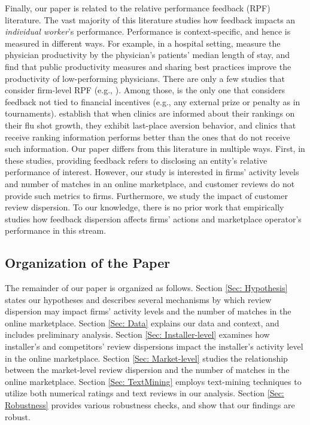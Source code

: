 \documentclass[msom,blindrev]{informs3}
\begin{document}
	
	
	
	Finally, our paper is related to the relative performance feedback (RPF) literature. The vast majority of this literature studies how feedback impacts an \emph{individual worker}'s performance. Performance is context-specific, and hence is measured in different ways. For example, in a hospital setting, \cite{song2017closing} measure the physician productivity by the physician's patients' median length of stay, and find that public productivity measures and sharing best practices improve the productivity of low-performing physicians. There are only a few studies that consider firm-level RPF (e.g., \cite{josse2013}). Among those, \cite{staats} is the only one that considers feedback not tied to financial incentives (e.g., any external prize or penalty as in tournaments). \cite{staats} establish that when clinics are informed about their rankings on their flu shot growth, they exhibit last-place aversion behavior, and clinics that receive ranking information performs better than the ones that do not receive such information. Our paper differs from this literature in multiple ways. First, in these studies, providing feedback refers to disclosing an entity's relative performance of interest. However, our study is interested in firms' activity levels and number of matches in an online marketplace, and customer reviews do not provide such metrics to firms. Furthermore, we study the impact of customer review dispersion. To our knowledge, there is no prior work that empirically studies how feedback dispersion affects firms' actions and marketplace operator's performance in this stream.
	
\subsection{Organization of the Paper}
	
	The remainder of our paper is organized as follows. Section \ref{Sec: Hypothesis} states our hypotheses and describes several mechanisms by which review dispersion may impact firms' activity levels and the number of matches in the online marketplace. Section \ref{Sec: Data} explains our data and context, and includes preliminary analysis. Section \ref{Sec: Installer-level} examines how installer's and competitors' review dispersions impact the installer's activity level in the online marketplace. Section \ref{Sec: Market-level} studies the relationship between the market-level review dispersion and the number of matches in the online marketplace. Section \ref{Sec: TextMining} employs text-mining techniques to utilize both numerical ratings and text reviews in our analysis. Section \ref{Sec: Robustness}  provides various robustness checks, and show that our findings are robust.
	
\end{document}
